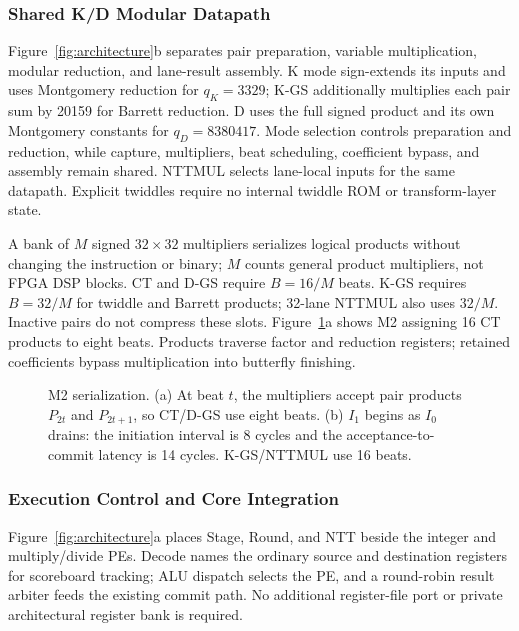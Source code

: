 \documentclass[conference,letterpaper]{IEEEtran}
\begin{document}
\subsubsection{Shared K/D Modular Datapath}
\label{sec:ntt-hw}
Figure~\ref{fig:architecture}b separates pair preparation, variable
multiplication, modular reduction, and lane-result assembly. K mode
sign-extends its inputs and uses Montgomery reduction for $q_K=3329$; K-GS
additionally multiplies each pair sum by 20159 for Barrett reduction. D uses
the full signed product and its own Montgomery constants for $q_D=8380417$.
Mode selection controls preparation and reduction, while capture, multipliers,
beat scheduling, coefficient bypass, and assembly remain shared. NTTMUL
selects lane-local inputs for the same datapath. Explicit twiddles require no
internal twiddle ROM or transform-layer state.

A bank of $M$ signed $32\times32$ multipliers serializes logical products
without changing the instruction or binary; $M$ counts general product
multipliers, not FPGA DSP blocks. CT and D-GS require $B=16/M$ beats. K-GS
requires $B=32/M$ for twiddle and Barrett products; 32-lane NTTMUL also uses
$32/M$. Inactive pairs do not compress these slots. Figure~\ref{fig:detail}a
shows M2 assigning 16 CT products to eight beats. Products traverse factor
and reduction registers; retained coefficients bypass multiplication into
butterfly finishing.

\begin{figure}[t]
\centering
\caption{M2 serialization. (a) At beat $t$, the multipliers accept pair
products $P_{2t}$ and $P_{2t+1}$, so CT/D-GS use eight beats. (b) $I_1$
begins as $I_0$ drains: the initiation interval is 8 cycles and the
acceptance-to-commit latency is 14 cycles. K-GS/NTTMUL use 16 beats.}
\label{fig:detail}
\end{figure}

\subsubsection{Execution Control and Core Integration}
Figure~\ref{fig:architecture}a places Stage, Round, and NTT beside the
integer and multiply/divide PEs. Decode names the ordinary source and
destination registers for scoreboard tracking; ALU dispatch selects the PE,
and a round-robin result arbiter feeds the existing commit path. No additional
register-file port or private architectural register bank is required.
\end{document}
